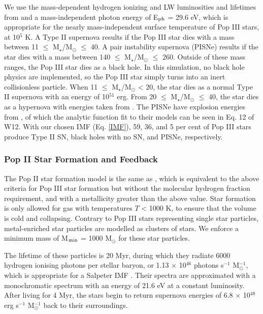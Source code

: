 \documentclass[fleqn,usenatbib]{mnras}
\begin{document}
We use the mass-dependent hydrogen ionizing and LW luminosities and lifetimes from \citet{Schaerer02} and a mass-independent photon energy of E$_{\rm ph}$ = 29.6 eV, which is appropriate for the nearly mass-independent surface temperature of Pop III stars, at 10$^{5}$ K. A Type II supernova results if the Pop III star dies with a mass between 11 $\leq$ M$_{\star}$/M$_{\odot}$ $\leq$ 40. A pair instability supernova (PISNe) results if the star dies with a mass between 140 $\leq$ M$_{\star}$/M$_{\odot}$ $\leq$ 260. Outside of these mass ranges, the Pop III star dies as a black hole. In this simulation, no black hole physics are implemented, so the Pop III star simply turns into an inert collisionless particle. When 11 $\leq$ M$_{\star}$/M$_{\odot}$ < 20, the star dies as a normal Type II supernova with an energy of 10$^{51}$ erg. From 20 $\leq$ M$_{\star}$/M$_{\odot}$ $\leq$ 40, the star dies as a hypernova with energies taken from \citet{Nomoto06}. The PISNe have explosion energies from \citet{2002ApJ...567..532H}, of which the analytic function fit to their models can be seen in Eq. 12 of W12. With our chosen IMF (Eq. \ref{IMF}), 59, 36, and 5 per cent of Pop III stars produce Type II SN, black holes with no SN, and PISNe, respectively.

\subsubsection{Pop II Star Formation and Feedback}
The Pop II star formation model is the same as \citet{Wise09}, which is equivalent to the above criteria for Pop III star formation but without the molecular hydrogen fraction requirement, and with a metallicity greater than the above value. Star formation is only allowed for gas with temperatures $T$ < 1000 K, to ensure that the volume is cold and collapsing. Contrary to Pop III stars representing single star particles, metal-enriched star particles are modelled as clusters of stars. We enforce a minimum mass of M$_{\rm min}$ = 1000 M$_{\odot}$ for these star particles. 

The lifetime of these particles is 20 Myr, during which they radiate 6000 hydrogen ionising photons per stellar baryon, or 1.13 $\times$ 10$^{46}$ photons s$^{-1}$ M$_{\odot}^{-1}$, which is appropriate for a Salpeter IMF \citep{Schaerer03}. Their spectra are approximated with a monochromatic spectrum with an energy of 21.6 eV at a constant luminosity. After living for 4 Myr, the stars begin to return supernova energies of 6.8 $\times$ 10$^{48}$ erg s$^{-1}$ M$_{\odot}^{-1}$ back to their surroundings.
\end{document}
